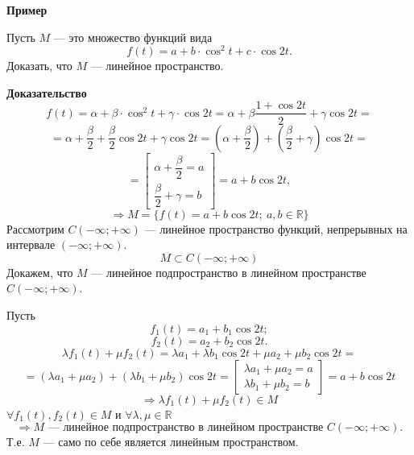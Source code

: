 \documentclass[12pt,a4paper]{article}
\begin{document}
\textbf{Пример}

Пусть $M$ --- это множество функций вида
$$
f(t)=a+b\cdot\cos^2 t+c\cdot\cos2t.
$$
Доказать, что $M$ --- линейное пространство.

\textbf{Доказательство}
$$
f(t)=\alpha+\beta\cdot\cos^2 t+\gamma\cdot\cos2t=
\alpha+\beta\frac{1+\cos2t}{2}+\gamma\cos2t=
$$
$$
=\alpha+\frac{\beta}{2}+\frac{\beta}{2}\cos2t+\gamma\cos2t=\left(\alpha+\frac{\beta}{2}\right)+\left(\frac{\beta}{2}+\gamma\right)\cos2t=
$$
$$
=\left[
\begin{array}{l}
\alpha+\dfrac{\beta}{2}=a\\[1mm]
\dfrac{\beta}{2}+\gamma=b
\end{array}
\right]=a+b\cos2t,
$$
$$
\Rightarrow M=\{f(t)=a+b\cos2t;\ a,b\in\mathbb R\}
$$
Рассмотрим $C(-\infty;+\infty)$ --- линейное пространство функций,
непрерывных на интервале $(-\infty;+\infty)$.
$$
M\subset C(-\infty;+\infty)
$$
Докажем, что $M$ --- линейное подпространство в линейном пространстве
$C(-\infty;+\infty)$.

Пусть
$$
f_1(t)=a_1+b_1\cos2t;
$$
$$
f_2(t)=a_2+b_2\cos2t.
$$
$$
\lambda f_1(t)+\mu f_2(t)=\lambda a_1+\lambda b_1\cos2t+\mu a_2+\mu b_2\cos2t=
$$
$$
=(\lambda a_1+\mu a_2)+(\lambda b_1+\mu b_2)\cos2t=
\left[
\begin{array}{l}
\lambda a_1+\mu a_2=a\\
\lambda b_1+\mu b_2=b
\end{array}
\right]=a+b\cos2t
$$
$$
\Rightarrow \lambda f_1(t)+\mu f_2(t)\in M
$$
$\forall f_1(t),f_2(t)\in M$ и $\forall\lambda,\mu\in\mathbb R$
$$
\Rightarrow M \text{ --- линейное подпространство в линейном
пространстве } C(-\infty;+\infty).
$$
Т.е. $M$ --- само по себе является линейным пространством.
\end{document}
